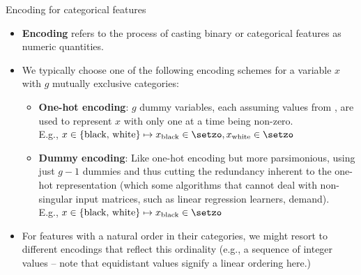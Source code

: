 \begin{vbframe}{Encoding for categorical features}

\begin{itemize}
  \small
  \item \textbf{Encoding} refers to the process of casting binary or categorical 
  features as numeric quantities.
  \item We typically choose one of the following encoding schemes for a variable 
  $x$ with $g$ mutually exclusive categories:
  \begin{itemize}
    \small
    \item \textbf{One-hot encoding}: $g$ dummy variables, each assuming values 
    from \setzo, are used to represent $x$ with only one at a time being 
    non-zero. \\
    E.g., $x \in \{ \text{black, white}\} \mapsto x_{\text{black}} 
    \in \setzo, x_{\text{white}} \in \setzo$
    \item \textbf{Dummy encoding}: Like one-hot encoding but more parsimonious, 
    using just $g - 1$ dummies and thus cutting the redundancy inherent to the 
    one-hot representation (which some algorithms that cannot deal with 
    non-singular input matrices, such as linear regression learners, demand). \\
    E.g., $x \in \{ \text{black, white}\} \mapsto x_{\text{black}} \in \setzo$
  \end{itemize}
  \item For features with a natural order in their categories, we might resort 
  to different encodings that reflect this ordinality (e.g., a sequence of 
  integer values -- note that equidistant values signify a linear ordering 
  here.)
\end{itemize}

\end{vbframe}


